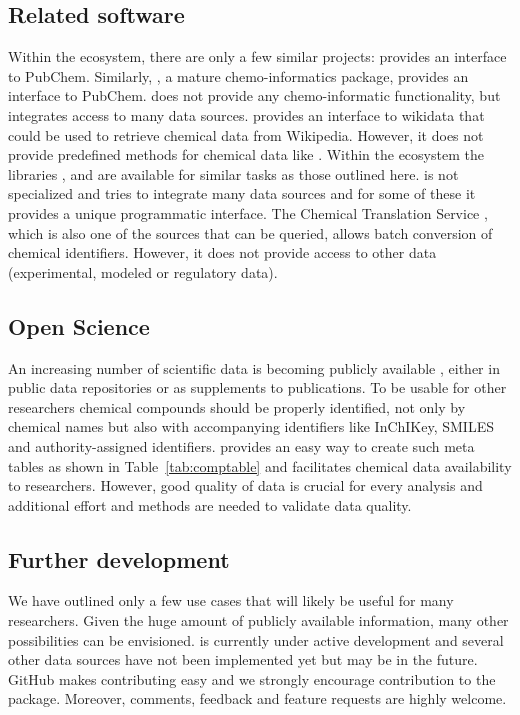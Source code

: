\documentclass[article]{jss}
\begin{document}
\subsection[Related software]{Related software}
Within the  ecosystem, there are only a few similar
projects:  \citep{rpubchem_2014} provides an interface
to PubChem.  Similarly,  \citep{chemminer_2008}, a
mature chemo-informatics package, provides an interface to PubChem.
 does not provide any chemo-informatic functionality, but
integrates access to many data sources.  
\citep{wikidatar_2016} provides an interface to wikidata that could be
used to retrieve chemical data from Wikipedia.  However, it does not
provide predefined methods for chemical data like .
Within the  \citep{python} ecosystem the libraries
 \citep{pubchempy},  \citep{chemspipy}
and  \citep{cirpy} are available for similar tasks as those
outlined here.   is not specialized and tries to
integrate many data sources and for some of these it provides a unique
programmatic interface.  The Chemical Translation Service
\citep{Wohlgemuth_Haldiya_Willighagen_Kind_Fiehn_2010}, which is also
one of the sources that can be queried, allows batch conversion of
chemical identifiers.  However, it does not provide access to other
data (experimental, modeled or regulatory data).


\subsection[Open Science]{Open Science}
An increasing number of scientific data is becoming publicly available
\citep{Gewin_2016, Reichman_Jones_Schildhauer_2011,Boyle_Guha_2011},
either in public data repositories or as supplements to publications.
To be usable for other researchers chemical compounds should be
properly identified, not only by chemical names but also with
accompanying identifiers like InChIKey, SMILES and authority-assigned
identifiers.   provides an easy way to create such meta
tables as shown in Table~\ref{tab:comptable} and facilitates chemical
data availability to researchers.  However, good quality of data is
crucial for every analysis \citep{Stieger_2014} and additional effort
and methods are needed to validate data quality.

\subsection[Further development]{Further development}
We have outlined only a few use cases that will likely be useful for
many researchers.  Given the huge amount of publicly available
information, many other possibilities can be envisioned.
 is currently under active development and several other
data sources have not been implemented yet but may be in the future.
GitHub makes contributing easy and we strongly encourage contribution
to the package.  Moreover, comments, feedback and feature requests are
highly welcome.
\end{document}
